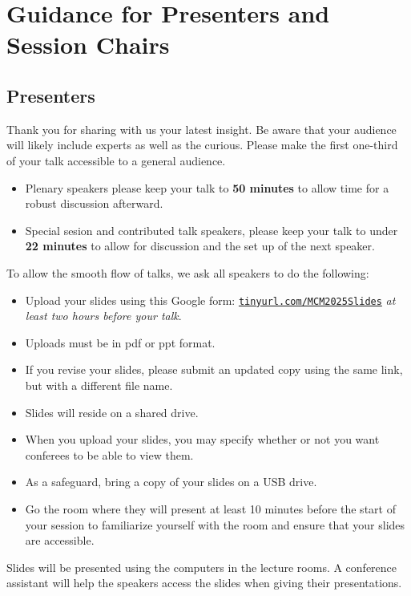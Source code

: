 \documentclass[12pt,lettersize,oneside]{book} %
\begin{document}
\section{Guidance for Presenters and Session Chairs}

\subsection{Presenters}

Thank you for sharing with us your latest insight.  Be aware that your audience will likely include experts as well as the curious.  Please make the first one-third of your talk accessible to a general audience.
\begin{itemize}
	\item Plenary speakers please keep your talk to \textbf{50 minutes} to allow time for a robust discussion afterward.
	\item Special sesion and contributed talk speakers, please keep your talk to under \textbf{22 minutes} to allow for discussion and the set up of the next speaker.
\end{itemize}

To allow the smooth flow of talks, we ask all speakers to do the following:
\begin{itemize}
	\item Upload your slides using this Google form: \href{https://tinyurl.com/MCM2025Slides}{\nolinkurl{tinyurl.com/MCM2025Slides}}  \emph{at least two hours before your talk}.
	\item Uploads must be in pdf or ppt format.
	\item If you revise your slides, please submit an updated copy using the same link, but with a different file name.
	\item Slides will reside on a shared drive.
	\item When you upload your slides, you may specify whether or not you want conferees to be able to view them.
	\item As a safeguard, bring a copy of your slides on a USB drive.
	\item Go the room where they will present at least 10 minutes before the start of your session to familiarize yourself with the room and ensure that your slides are accessible.
\end{itemize}
Slides will be presented using the computers in the lecture rooms.  A conference assistant will help the speakers access the slides when giving their presentations.
\end{document}
